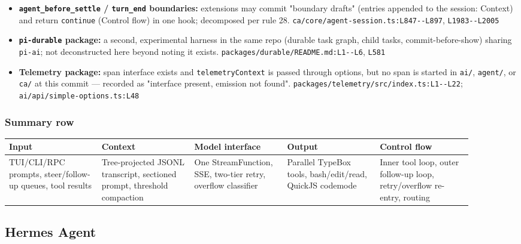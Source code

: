 \begin{itemize}
\item \textbf{\texttt{agent\_\allowbreak{}before\_\allowbreak{}settle} / \texttt{turn\_\allowbreak{}end} boundaries:} extensions may commit "boundary drafts" (entries appended to the session: Context) and return \texttt{continue} (Control flow) in one hook; decomposed per rule 28. \texttt{ca/\allowbreak{}core/\allowbreak{}agent-\allowbreak{}session.\allowbreak{}ts:\allowbreak{}L847-\allowbreak{}-\allowbreak{}L897}, \texttt{L1983-\allowbreak{}-\allowbreak{}L2005}
\item \textbf{\texttt{pi-\allowbreak{}durable} package:} a second, experimental harness in the same repo (durable task graph, child tasks, commit-before-show) sharing \texttt{pi-\allowbreak{}ai}; not deconstructed here beyond noting it exists. \texttt{packages/\allowbreak{}durable/\allowbreak{}README.\allowbreak{}md:\allowbreak{}L1-\allowbreak{}-\allowbreak{}L6}, \texttt{L581}
\item \textbf{Telemetry package:} span interface exists and \texttt{telemetryContext} is passed through options, but no span is started in \texttt{ai/\allowbreak{}}, \texttt{agent/\allowbreak{}}, or \texttt{ca/\allowbreak{}} at this commit --- recorded as "interface present, emission not found". \texttt{packages/\allowbreak{}telemetry/\allowbreak{}src/\allowbreak{}index.\allowbreak{}ts:\allowbreak{}L1-\allowbreak{}-\allowbreak{}L22}; \texttt{ai/\allowbreak{}api/\allowbreak{}simple-\allowbreak{}options.\allowbreak{}ts:\allowbreak{}L48}
\end{itemize}

\subsubsection*{Summary row}
\begin{longtable}{@{}p{0.18\linewidth}p{0.18\linewidth}p{0.18\linewidth}p{0.18\linewidth}p{0.18\linewidth}@{}}
\toprule \textbf{Input} & \textbf{Context} & \textbf{Model interface} & \textbf{Output} & \textbf{Control flow} \\ \midrule \endhead
TUI/CLI/RPC prompts, steer/follow-up queues, tool results & Tree-projected JSONL transcript, sectioned prompt, threshold compaction & One StreamFunction, SSE, two-tier retry, overflow classifier & Parallel TypeBox tools, bash/edit/read, QuickJS codemode & Inner tool loop, outer follow-up loop, retry/overflow re-entry, routing \\
\bottomrule \end{longtable}


\subsection{Hermes Agent}

